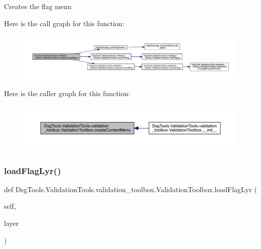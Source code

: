 \begin{DoxyVerb}Creates the flag menu
\end{DoxyVerb}
 Here is the call graph for this function\+:
\nopagebreak
\begin{figure}[H]
\begin{center}
\leavevmode
\includegraphics[width=350pt]{class_dsg_tools_1_1_validation_tools_1_1validation__toolbox_1_1_validation_toolbox_a6957567427f23a92c28e7c1aa93a0aa2_cgraph}
\end{center}
\end{figure}
Here is the caller graph for this function\+:
\nopagebreak
\begin{figure}[H]
\begin{center}
\leavevmode
\includegraphics[width=350pt]{class_dsg_tools_1_1_validation_tools_1_1validation__toolbox_1_1_validation_toolbox_a6957567427f23a92c28e7c1aa93a0aa2_icgraph}
\end{center}
\end{figure}
\mbox{\label{class_dsg_tools_1_1_validation_tools_1_1validation__toolbox_1_1_validation_toolbox_a27ccb8e739581f57ad7b112a937ffc0f}} 
\subsubsection{\texorpdfstring{load\+Flag\+Lyr()}{loadFlagLyr()}}
{\footnotesize\ttfamily def Dsg\+Tools.\+Validation\+Tools.\+validation\+\_\+toolbox.\+Validation\+Toolbox.\+load\+Flag\+Lyr (\begin{DoxyParamCaption}\item[{}]{self,  }\item[{}]{layer }\end{DoxyParamCaption})}

